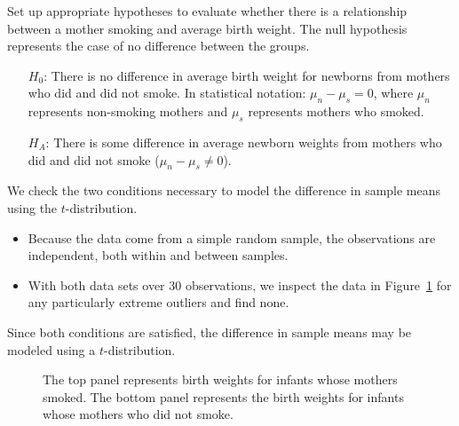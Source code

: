 \begin{examplewrap}
\begin{nexample}{Set up appropriate hypotheses to evaluate
    whether there is a relationship between a mother smoking
    and average birth weight.}
  \label{babySmokeHTForWeight}%
  The null hypothesis represents the case of no difference
  between the groups.
  \begin{itemize}
  \setlength{\itemsep}{0mm}
  \item[$H_0$:]
      There is no difference in average birth weight for
      newborns from mothers who did and did not smoke.
      In statistical notation: $\mu_{n} - \mu_{s} = 0$,
      where $\mu_{n}$ represents non-smoking mothers and
      $\mu_s$ represents mothers who smoked.
  \item[$H_A$:]
      There is some difference in average newborn weights
      from mothers who did and did not smoke
      ($\mu_{n} - \mu_{s} \neq 0$).
  \end{itemize}
\end{nexample}
\end{examplewrap}

We check the two conditions necessary to model the difference
in sample means using the $t$-distribution.
\begin{itemize}
\item
    Because the data come from a simple random sample,
    the observations are independent,
    both within and between samples.
\item
    With both data sets over 30 observations,
    we inspect the data in
    Figure~\ref{babySmokePlotOfTwoGroupsToExamineSkew}
    for any particularly extreme outliers
    and find none.
\end{itemize}
Since both conditions are satisfied, the difference
in sample means may be modeled using a $t$-distribution.

\begin{figure}[hhh]
  \centering
  \caption{The top panel represents birth weights for infants
      whose mothers smoked.
      The bottom panel represents the birth weights for
      infants whose mothers who did not smoke.}
  \label{babySmokePlotOfTwoGroupsToExamineSkew}
\end{figure}




